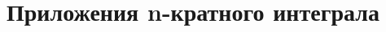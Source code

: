 \documentclass[../main.tex]{subfiles}
\begin{document}
 \chapter{Приложения n-кратного интеграла}
 
\end{document}
